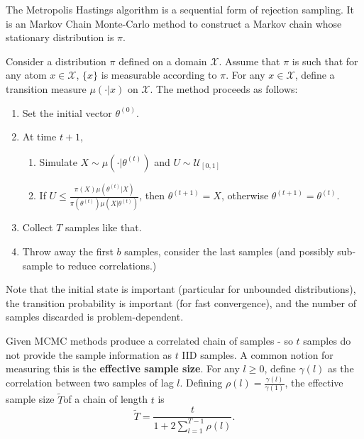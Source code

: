 \begin{defn}
  \label{sec:bayes-infer-assoc-3}
  The Metropolis Hastings algorithm is a sequential form of rejection
  sampling.  It is an Markov Chain Monte-Carlo method to construct a
  Markov chain whose stationary distribution is $\pi$.

  Consider a distribution $\pi$ defined on a domain $\mathcal{X}$.
  Assume that $\pi$ is such that for any atom $x \in \mathcal{X}$, $\{
  x \} $ is measurable according to $\pi$.  For any $x \in
  \mathcal{X}$, define a transition measure $\mu(\cdot | x)$ on
  $\mathcal{X}$.  
  The method proceeds as follows:
  \begin{enumerate}
  \item Set the initial vector $\theta^{(0)}$.
  \item At time $t+1$,
    \begin{enumerate}
    \item Simulate $X \sim \mu(\cdot | \theta^{(t)})$ and $U \sim
      \mathcal{U}_{[0, 1]}$
    \item If $U \leq \frac{\pi(X) \mu(\theta^{(t)} |
        X)}{\pi(\theta^{(t)}) \mu(X | \theta^{(t)})}$, then
      $\theta^{(t+1)} = X$, otherwise $\theta^{(t+1)} = \theta^{(t)}$.
    \end{enumerate}
  \item Collect $T$ samples like that.
  \item Throw away the first $b$ samples, consider the last samples
    (and possibly sub-sample to reduce correlations.)
  \end{enumerate}

  Note that the initial state is important (particular for unbounded
  distributions), the transition probability is important (for fast
  convergence), and the number of samples discarded is
  problem-dependent.
\end{defn}

\begin{defn}
  \label{sec:bayes-infer-assoc-4}
  Given MCMC methods produce a correlated chain of samples - so $t$
  samples do not provide the sample information as $t$ IID samples.  A
  common notion for measuring this is the \textbf{effective sample
    size}.  For any $l \geq 0$, define $\gamma(l)$ as the correlation
  between two samples of lag $l$.  Defining $\rho(l) =
  \frac{\gamma(l)}{\gamma(1)}$, the effective sample size $\tilde T$of
  a chain of length $t$ is
  \begin{equation}
    \label{eq:8}
    \tilde T = \frac{t}{1 + 2 \sum_{l=1}^{T-1} \rho(l)}.
  \end{equation}
\end{defn}




